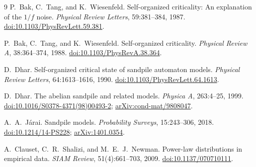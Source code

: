 \documentclass[11pt,a4paper,oneside]{report}
\numberwithin{equation}{chapter}
\begin{document}
\clearpage
{}
{}
\begin{thebibliography}{9}
P.~Bak, C.~Tang, and K.~Wiesenfeld.
Self-organized criticality: An explanation of the $1/f$ noise.
\emph{Physical Review Letters}, 59:381--384, 1987.
\href{https://doi.org/10.1103/PhysRevLett.59.381}{doi:10.1103/PhysRevLett.59.381}.

P.~Bak, C.~Tang, and K.~Wiesenfeld.
Self-organized criticality.
\emph{Physical Review A}, 38:364--374, 1988.
\href{https://doi.org/10.1103/PhysRevA.38.364}{doi:10.1103/PhysRevA.38.364}.

D.~Dhar.
Self-organized critical state of sandpile automaton models.
\emph{Physical Review Letters}, 64:1613--1616, 1990.
\href{https://doi.org/10.1103/PhysRevLett.64.1613}{doi:10.1103/PhysRevLett.64.1613}.

D.~Dhar.
The abelian sandpile and related models.
\emph{Physica A}, 263:4--25, 1999.
\href{https://doi.org/10.1016/S0378-4371(98)00493-2}{doi:10.1016/S0378-4371(98)00493-2};
\href{https://arxiv.org/abs/cond-mat/9808047}{arXiv:cond-mat/9808047}.

A.~A.~J\'arai.
Sandpile models.
\emph{Probability Surveys}, 15:243--306, 2018.
\href{https://doi.org/10.1214/14-PS228}{doi:10.1214/14-PS228};
\href{https://arxiv.org/abs/1401.0354}{arXiv:1401.0354}.

A.~Clauset, C.~R.~Shalizi, and M.~E.~J.~Newman.
Power-law distributions in empirical data.
\emph{SIAM Review}, 51(4):661--703, 2009.
\href{https://doi.org/10.1137/070710111}{doi:10.1137/070710111}.

\end{thebibliography}
\end{document}

